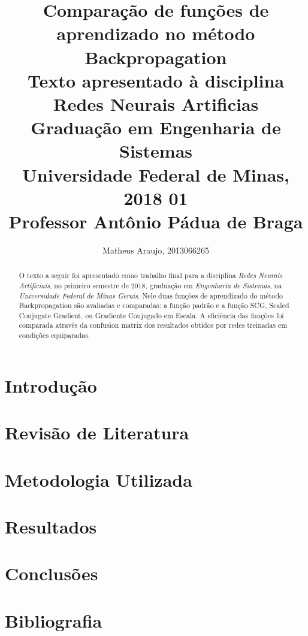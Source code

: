 \documentclass[journal]{IEEEtran}
\begin{document}
\title{
	Comparação de funções de aprendizado no método Backpropagation \\ 
	\large Texto apresentado à disciplina Redes Neurais Artificias \\ 
	Graduação em Engenharia de Sistemas \\
	Universidade Federal de Minas, 2018 01 \\ 
	Professor Antônio Pádua de Braga
}
\author{Matheus Araujo, 2013066265}

\maketitle

\begin{abstract}
O texto a seguir foi apresentado como trabalho final para a disciplina \emph{Redes Neurais Artificiais}, no primeiro semestre de 2018, graduação em \emph{Engenharia de Sistemas}, na \emph{Universidade Federal de Minas Gerais}. Nele duas funções de aprendizado do método Backpropagation são avaliadas e comparadas: a função padrão e a função SCG, Scaled Conjugate Gradient, ou Gradiente Conjugado em Escala. A eficiência das funções foi comparada através da confusion matrix dos resultados obtidos por redes treinadas em condições equiparadas.
\end{abstract}

\section{Introdução}



\section{Revisão de Literatura}



\section{Metodologia Utilizada}



\section{Resultados}



\section{Conclusões}



\section{Bibliografia}


\end{document}
